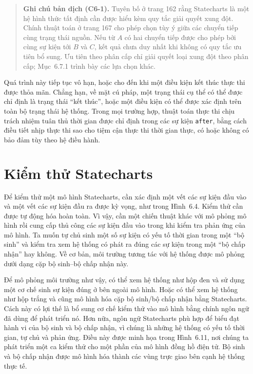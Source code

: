 \begin{quote}
\small\textbf{Ghi chú bản dịch (C6-1).} Tuyên bố ở trang 162 rằng Statecharts là một hệ hình thức tất định cần được hiểu kèm quy tắc giải quyết xung đột. Chính thuật toán ở trang 167 cho phép chọn tùy ý giữa các chuyển tiếp cùng trạng thái nguồn. Nếu từ $A$ có hai chuyển tiếp được cho phép bởi cùng sự kiện tới $B$ và $C$, kết quả chưa duy nhất khi không có quy tắc ưu tiên bổ sung. Ưu tiên theo phân cấp chỉ giải quyết loại xung đột theo phân cấp; Mục~6.7.1 trình bày các lựa chọn khác.
\end{quote}

Quá trình này tiếp tục vô hạn, hoặc cho đến khi một điều kiện kết thúc thực thi được thỏa mãn. Chẳng hạn, về mặt cú pháp, một trạng thái cụ thể có thể được chỉ định là trạng thái ``kết thúc'', hoặc một điều kiện có thể được xác định trên toàn bộ trạng thái hệ thống. Trong mọi trường hợp, thuật toán thực thi chịu trách nhiệm tuân thủ thời gian được chỉ định trong các sự kiện \texttt{after}, bằng cách điều tiết nhịp thực thi sao cho tiệm cận thực thi thời gian thực, có hoặc không có bảo đảm tùy theo hệ điều hành.

\section{Kiểm thử Statecharts}
Để kiểm thử một mô hình Statecharts, cần xác định một vết các sự kiện đầu vào và một vết các sự kiện đầu ra được kỳ vọng, như trong Hình~6.4. Kiểm thử cần được tự động hóa hoàn toàn. Vì vậy, cần một chiến thuật khác với mô phỏng mô hình rồi cung cấp thủ công các sự kiện đầu vào trong khi kiểm tra phản ứng của mô hình. Ta muốn tự chủ sinh một số sự kiện có yếu tố thời gian trong một ``bộ sinh'' và kiểm tra xem hệ thống có phát ra đúng các sự kiện trong một ``bộ chấp nhận'' hay không. Về cơ bản, môi trường tương tác với hệ thống được mô phỏng dưới dạng cặp bộ sinh--bộ chấp nhận này.

Để mô phỏng môi trường như vậy, có thể xem hệ thống như hộp đen và sử dụng một cơ chế sinh sự kiện đúng ở bên ngoài mô hình. Hoặc có thể xem hệ thống như hộp trắng và cũng mô hình hóa cặp bộ sinh/bộ chấp nhận bằng Statecharts. Cách này có lợi thế là bổ sung cơ chế kiểm thử vào mô hình bằng chính ngôn ngữ đã dùng để phát triển nó. Hơn nữa, ngôn ngữ Statecharts phù hợp để biểu đạt hành vi của bộ sinh và bộ chấp nhận, vì chúng là những hệ thống có yếu tố thời gian, tự chủ và phản ứng. Điều này được minh họa trong Hình~6.11, nơi chúng ta phát triển một ca kiểm thử cho một phần của mô hình đồng hồ điện tử. Bộ sinh và bộ chấp nhận được mô hình hóa thành các vùng trực giao bên cạnh hệ thống thực tế.

